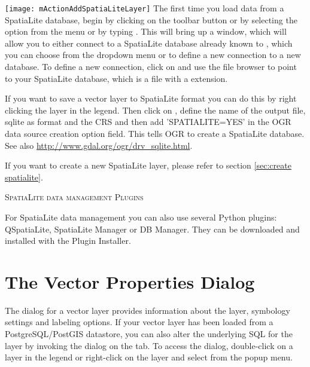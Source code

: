 \texttt{[image: mActionAddSpatiaLiteLayer]}
The first time you load data from a SpatiaLite database, begin by clicking on the
 toolbar button or 
by selecting the 
option from the  menu or by typing .
This will bring up a window, which will allow you to either connect to a SpatiaLite 
database already known to \qg, which you can choose from the dropdown menu or to define 
a new connection to a new database. To define a new connection, click on  and 
use the file browser to point to your SpatiaLite database, which is a file with 
a  extension.

If you want to save a vector layer to SpatiaLite format you can do this by right clicking
the layer in the legend. Then click on , define the name of the output 
file, sqlite as format and the CRS and then add 'SPATIALITE=YES' in the OGR data source 
creation option field. This tells OGR to create a SpatiaLite database. See 
also \url{http://www.gdal.org/ogr/drv_sqlite.html}.


If you want to create a new SpatiaLite layer, please refer to section \ref{sec:create spatialite}.

\begin{Tip}\caption{\textsc{SpatiaLite data management Plugins}}
For SpatiaLite data management you can also use several Python plugins:
QSpatiaLite, SpatiaLite Manager or DB Manager. They can be downloaded and 
installed with the Plugin Installer. 
\end{Tip}

\section{The Vector Properties Dialog}\label{sec:vectorprops}

The  dialog for a vector layer provides information
about the layer, symbology settings and labeling options. If your vector
layer has been loaded from a PostgreSQL/PostGIS datastore, you can also alter
the underlying SQL for the layer by invoking the 
dialog on the  tab.
To access the  dialog, double-click on a layer in
the legend or right-click on the layer and select 
from the popup menu.

